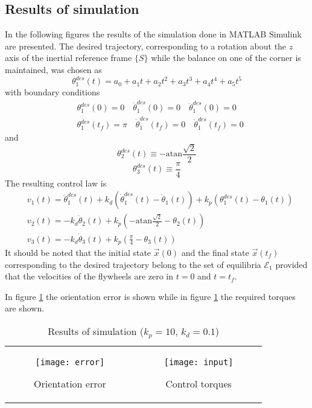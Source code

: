 \subsection{Results of simulation}
In the following figures the results of the simulation done
in MATLAB Simulink are presented. The desired trajectory, corresponding to a rotation about the $z$ axis of the inertial
reference frame $\{S\}$ while the balance on one of the corner is maintained, was chosen as
\[
\theta_1^{des}(t) = a_0 + a_1 t + a_2 t^2 + a_3 t^3 + a_4 t^4 + a_5 t^5
\]
with boundary conditions
\[
\begin{split}
  &\theta_1^{des}(0) = 0 \quad \dot{\theta}_1^{des}(0)= 0 \quad \ddot{\theta}_1^{des}(0) = 0\\
    &\theta_1^{des}(t_{f}) = \pi \quad \dot{\theta}_1^{des}(t_{f})= 0 \quad \ddot{\theta}_1^{des}(t_{f}) = 0
\end{split}
\]
and
\[
\theta_2^{des}(t) \equiv -\mathrm{atan}\frac{\sqrt{2}}{2}
\]
\[
\theta_3^{des}(t) \equiv \frac{\pi}{4}
\]
The resulting control law is
\begin{equation}\label{eq:PD_yaw}
  \begin{split}
    &v_1(t) = \ddot{\theta}_1^{des}(t) + k_d(\dot{\theta}_1^{des}(t) - \dot{\theta}_1(t)) + k_p (\theta_1^{des}(t) - \theta_1(t))\\
    &v_2(t) = - k_d\dot{\theta}_2(t) + k_p \left(-\mathrm{atan}\frac{\sqrt{2}}{2} - \theta_2(t)\right)\\
    &v_3(t) = - k_d\dot{\theta}_3(t) + k_p \left(\frac{\pi}{4} - \theta_3(t)\right)
  \end{split}
\end{equation}
It should be noted that the initial state $\vec{x}(0)$ and the final state $\vec{x}(t_{f})$
corresponding to the desired trajectory belong to the set of equilibria $\mathcal{E}_{1}$ provided that
the velocities of the flywheels are zero in $t=0$ and $t=t_{f}$.
\par
In figure \ref{fig:orientation_error} the orientation error is shown while
in figure \ref{fig:requested_torques} the required torques are shown.
\begin{table}[h]
  \begin{tabular}{cc}
    \begin{subfigure}{0.5\textwidth}
      \centering
      \texttt{[image: error]}
      \caption{Orientation error \label{fig:orientation_error}}
    \end{subfigure}&
    \begin{subfigure}{0.5\textwidth}
      \centering
      \texttt{[image: input]}
      \caption{Control torques \label{fig:requested_torques}}
    \end{subfigure}
  \end{tabular}
  \caption{Results of simulation ($k_p = 10$, $k_d = 0.1$)}
\end{table}

